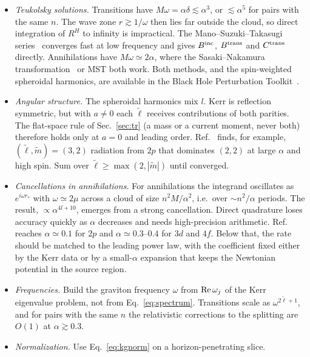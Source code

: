 \documentclass[11pt]{article}
\begin{document}
\begin{itemize}
\item \emph{Teukolsky solutions.} Transitions have $M\omega=\alpha\delta\lesssim\alpha^3$, or $\lesssim\alpha^5$ for pairs with the same $n$. The wave zone $r\gtrsim1/\omega$ then lies far outside the cloud, so direct integration of $R^H$ to infinity is impractical. The Mano--Suzuki--Takasugi series~\cite{MST96} converges fast at low frequency and gives $B^{\rm inc}$, $B^{\rm trans}$ and $C^{\rm trans}$ directly. Annihilations have $M\omega\simeq2\alpha$, where the Sasaki--Nakamura transformation~\cite{SN82} or MST both work. Both methods, and the spin-weighted spheroidal harmonics, are available in the Black Hole Perturbation Toolkit~\cite{BHPT}.
\item \emph{Angular structure.} The spheroidal harmonics mix $l$. Kerr is reflection symmetric, but with $a\neq0$ each $\tilde\ell$ receives contributions of both parities. The flat-space rule of Sec.~\ref{sec:tr} (a mass or a current moment, never both) therefore holds only at $a=0$ and leading order. Ref.~\cite{YK14} finds, for example, $(\tilde\ell,\tilde m)=(3,2)$ radiation from $2p$ that dominates $(2,2)$ at large $\alpha$ and high spin. Sum over $\tilde\ell\ge\max(2,|\tilde m|)$ until converged.
\item \emph{Cancellations in annihilations.} For annihilations the integrand oscillates as $e^{i\omega r_*}$ with $\omega\simeq2\mu$ across a cloud of size $n^2M/\alpha^2$, i.e.\ over $\sim n^2/\alpha$ periods. The result, $\propto\alpha^{4l+10}$, emerges from a strong cancellation. Direct quadrature loses accuracy quickly as $\alpha$ decreases and needs high-precision arithmetic. Ref.~\cite{YK14} reaches $\alpha\simeq0.1$ for $2p$ and $\alpha\simeq0.3$--$0.4$ for $3d$ and $4f$. Below that, the rate should be matched to the leading power law, with the coefficient fixed either by the Kerr data or by a small-$\alpha$ expansion that keeps the Newtonian potential in the source region.
\item \emph{Frequencies.} Build the graviton frequency $\omega$ from ${\rm Re}\,\omega_j$ of the Kerr eigenvalue problem, not from Eq.~\eqref{eq:spectrum}. Transitions scale as $\omega^{2\tilde\ell+1}$, and for pairs with the same $n$ the relativistic corrections to the splitting are $O(1)$ at $\alpha\gtrsim0.3$.
\item \emph{Normalization.} Use Eq.~\eqref{eq:kgnorm} on a horizon-penetrating slice.
\end{itemize}
\end{document}
